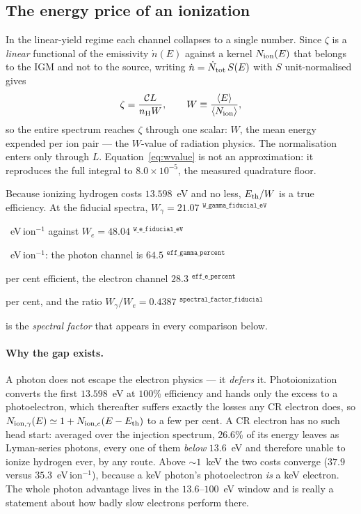 \documentclass[11pt,a4paper]{article}
\newif\ifprovdraft
\newcommand{\src}[1]{%
  \ifprovdraft
    \ifmmode{}^{\text{\color{gray}\scriptsize\texttt{#1}}}%
    \else{\color{gray}\scriptsize$^{\texttt{#1}}$}%
    \fi
  \fi}
\begin{document}
\subsection{The energy price of an ionization}\label{sec:wvalue}
In the linear-yield regime each channel collapses to a single number. Since
$\zeta$ is a \emph{linear} functional of the emissivity $\dot n(E)$ against a
kernel $N_{\rm ion}(E)$ that belongs to the IGM and not to the source, writing
$\dot n = \dot N_{\rm tot}\,S(E)$ with $S$ unit-normalised gives
\begin{equation}
  \zeta = \frac{\mathcal{C}L}{n_{\rm H}W},
  \qquad
  W \equiv \frac{\langle E\rangle}{\langle N_{\rm ion}\rangle},
  \label{eq:wvalue}
\end{equation}
so the entire spectrum reaches $\zeta$ through one scalar: $W$, the mean energy
expended per ion pair --- the $W$-value of radiation physics. The normalisation
enters only through $L$. Equation~\eqref{eq:wvalue} is not an approximation: it
reproduces the full integral to $8.0\times10^{-5}$, the measured quadrature floor.

Because ionizing hydrogen costs $13.598$~eV and no less, $E_{\rm th}/W$ is a true
efficiency. At the fiducial spectra,
$W_\gamma = 21.07$\src{W\_gamma\_fiducial\_eV}~eV\,ion$^{-1}$ against
$W_e = 48.04$\src{W\_e\_fiducial\_eV}~eV\,ion$^{-1}$: the photon channel is
$64.5$\src{eff\_gamma\_percent} per cent efficient, the electron
channel $28.3$\src{eff\_e\_percent} per cent, and the ratio
$W_\gamma/W_e = 0.4387$\src{spectral\_factor\_fiducial} is the \emph{spectral
factor} that appears in every comparison below.

\paragraph{Why the gap exists.} A photon does not escape the electron physics ---
it \emph{defers} it. Photoionization converts the first $13.598$~eV at $100$\%
efficiency and hands only the excess to a photoelectron, which thereafter suffers
exactly the losses any CR electron does, so
$N_{{\rm ion},\gamma}(E)\simeq1+N_{{\rm ion},e}(E-E_{\rm th})$ to a few per cent.
A CR electron has no such head start: averaged over the injection spectrum,
$26.6$\% of its energy leaves as Lyman-series photons, every one of them
\emph{below} $13.6$~eV and therefore unable to ionize hydrogen ever, by any route.
Above $\sim1$~keV the two costs converge ($37.9$ versus $35.3$~eV\,ion$^{-1}$),
because a keV photon's photoelectron \emph{is} a keV electron. The whole photon
advantage lives in the $13.6$--$100$~eV window and is really a statement about how
badly slow electrons perform there.
\end{document}
